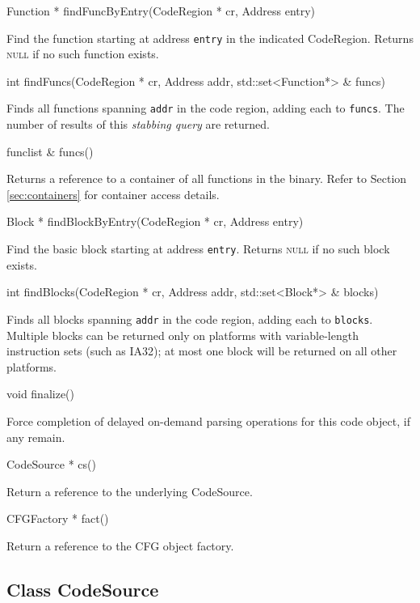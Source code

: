 \documentclass{article}
\newenvironment{apient}{\small\verbatim}{\endverbatim}
\newcommand{\apidesc}[1]{%
{\addtolength{\leftskip}{4em}%
#1\par\medskip}
}
\begin{document}
\begin{apient}
Function * findFuncByEntry(CodeRegion * cr, Address entry)
\end{apient}
\apidesc{Find the function starting at address \texttt{entry} in the indicated CodeRegion. Returns {\scshape null} if no such function exists.}

\begin{apient}
int findFuncs(CodeRegion * cr, Address addr, std::set<Function*> & funcs)
\end{apient}
\apidesc{Finds all functions spanning \texttt{addr} in the code region, adding each to \texttt{funcs}. The number of results of this \emph{stabbing query} are returned.}

\begin{apient}
funclist & funcs()
\end{apient}
\apidesc{Returns a reference to a container of all functions in the binary. Refer to Section \ref{sec:containers} for container access details.}

\begin{apient}
Block * findBlockByEntry(CodeRegion * cr, Address entry)
\end{apient}
\apidesc{Find the basic block starting at address \texttt{entry}. Returns {\scshape null} if no such block exists.}

\begin{apient}
int findBlocks(CodeRegion * cr, Address addr, std::set<Block*> & blocks)
\end{apient}
\apidesc{Finds all blocks spanning \texttt{addr} in the code region, adding each to \texttt{blocks}. Multiple blocks can be returned only on platforms with variable-length instruction sets (such as IA32); at most one block will be returned on all other platforms.}

\begin{apient}
void finalize()
\end{apient}
\apidesc{Force completion of delayed on-demand parsing operations for this code object, if any remain.}

\begin{apient}
CodeSource * cs()
\end{apient}
\apidesc{Return a reference to the underlying CodeSource.}

\begin{apient}
CFGFactory * fact()
\end{apient}
\apidesc{Return a reference to the CFG object factory.}

\subsection{Class CodeSource}
\label{sec:codesource}
\end{document}
